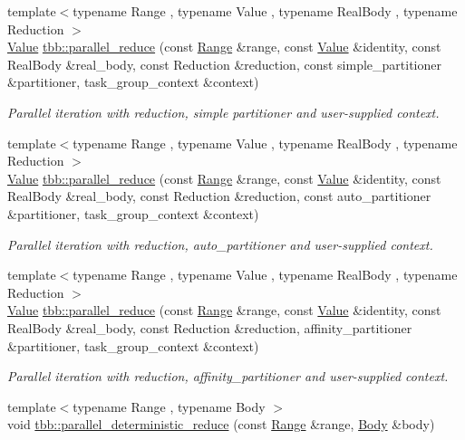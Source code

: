 \begin{DoxyCompactItemize}
{\footnotesize template$<$typename Range , typename Value , typename Real\+Body , typename Reduction $>$ }\\\hyperlink{structValue}{Value} \hyperlink{group__algorithms_ga518ef2653004d60319bdfc1c6bce86b6}{tbb\+::parallel\+\_\+reduce} (const \hyperlink{classtbb_1_1blocked__range}{Range} \&range, const \hyperlink{structValue}{Value} \&identity, const Real\+Body \&real\+\_\+body, const Reduction \&reduction, const simple\+\_\+partitioner \&partitioner, task\+\_\+group\+\_\+context \&context)
\begin{DoxyCompactList}\small\item\em Parallel iteration with reduction, simple partitioner and user-\/supplied context. \end{DoxyCompactList}\item 
{\footnotesize template$<$typename Range , typename Value , typename Real\+Body , typename Reduction $>$ }\\\hyperlink{structValue}{Value} \hyperlink{group__algorithms_ga24ba50caf5a7c32cbd38912508cb69a4}{tbb\+::parallel\+\_\+reduce} (const \hyperlink{classtbb_1_1blocked__range}{Range} \&range, const \hyperlink{structValue}{Value} \&identity, const Real\+Body \&real\+\_\+body, const Reduction \&reduction, const auto\+\_\+partitioner \&partitioner, task\+\_\+group\+\_\+context \&context)
\begin{DoxyCompactList}\small\item\em Parallel iteration with reduction, auto\+\_\+partitioner and user-\/supplied context. \end{DoxyCompactList}\item 
{\footnotesize template$<$typename Range , typename Value , typename Real\+Body , typename Reduction $>$ }\\\hyperlink{structValue}{Value} \hyperlink{group__algorithms_ga367a8e77c4dac3f8764785afdc6c9299}{tbb\+::parallel\+\_\+reduce} (const \hyperlink{classtbb_1_1blocked__range}{Range} \&range, const \hyperlink{structValue}{Value} \&identity, const Real\+Body \&real\+\_\+body, const Reduction \&reduction, affinity\+\_\+partitioner \&partitioner, task\+\_\+group\+\_\+context \&context)
\begin{DoxyCompactList}\small\item\em Parallel iteration with reduction, affinity\+\_\+partitioner and user-\/supplied context. \end{DoxyCompactList}\item 
{\footnotesize template$<$typename Range , typename Body $>$ }\\void \hyperlink{group__algorithms_ga1fd7e3c43592dfe1ae3e3572bd80d4f6}{tbb\+::parallel\+\_\+deterministic\+\_\+reduce} (const \hyperlink{classtbb_1_1blocked__range}{Range} \&range, \hyperlink{classBody}{Body} \&body)

\end{DoxyCompactItemize}

